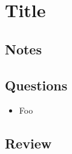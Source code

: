 \section{Title \cite{key}}
\subsection{Notes}

\subsection{Questions}
\begin{itemize}
  \item Foo
\end{itemize}

\subsection{Review}
